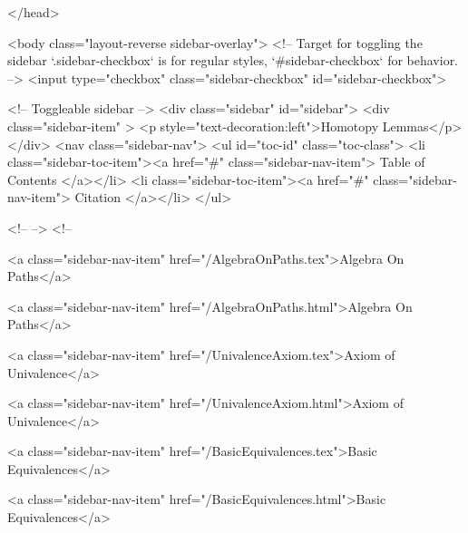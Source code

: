   
</head>




  <body class="layout-reverse sidebar-overlay">
    <!-- Target for toggling the sidebar `.sidebar-checkbox` is for regular
     styles, `#sidebar-checkbox` for behavior. -->
<input type="checkbox" class="sidebar-checkbox" id="sidebar-checkbox">

<!-- Toggleable sidebar -->
<div class="sidebar" id="sidebar">
  <div class="sidebar-item" >
    <p style="text-decoration:left">Homotopy Lemmas</p>
  </div>
  <nav class="sidebar-nav">
    <ul id="toc-id" class="toc-class">
  <li class="sidebar-toc-item"><a href="#" class="sidebar-nav-item"> Table of Contents </a></li>
  <li class="sidebar-toc-item"><a href="#" class="sidebar-nav-item"> Citation </a></li>
</ul>


    <!--  -->
    <!-- 
      
    
      
    
      
    
      
    
      
        
      
    
      
        
          <a class="sidebar-nav-item" href="/AlgebraOnPaths.tex">Algebra On Paths</a>
        
      
    
      
        
          <a class="sidebar-nav-item" href="/AlgebraOnPaths.html">Algebra On Paths</a>
        
      
    
      
        
          <a class="sidebar-nav-item" href="/UnivalenceAxiom.tex">Axiom of Univalence</a>
        
      
    
      
        
          <a class="sidebar-nav-item" href="/UnivalenceAxiom.html">Axiom of Univalence</a>
        
      
    
      
        
          <a class="sidebar-nav-item" href="/BasicEquivalences.tex">Basic Equivalences</a>
        
      
    
      
        
          <a class="sidebar-nav-item" href="/BasicEquivalences.html">Basic Equivalences</a>
        
